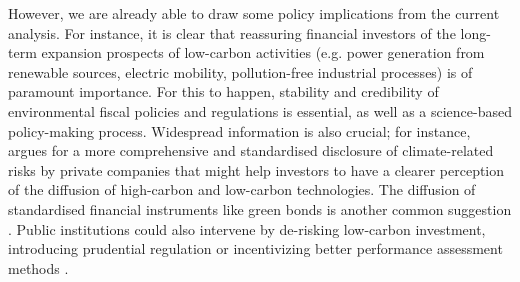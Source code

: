 \documentclass[authoryear]{article}
\begin{document}
However, we are already able to draw some policy implications from the current analysis. For instance, it is clear that reassuring financial investors of the long-term expansion prospects of low-carbon activities (e.g. power generation from renewable sources, electric mobility, pollution-free industrial processes) is of paramount importance. For this to happen, stability and credibility of environmental fiscal policies and regulations is essential, as well as a science-based policy-making process.  Widespread information is also crucial; for instance, \citet{TCFD2016} argues for a more comprehensive and standardised disclosure of climate-related risks by private companies that might help investors to have a clearer perception of the diffusion of high-carbon and low-carbon technologies. The diffusion of standardised financial instruments like green bonds is another common suggestion \citep{CBI2016}. Public institutions could also intervene by de-risking low-carbon investment, introducing prudential regulation or incentivizing better performance assessment methods \citep{UNEPInquiry2015}.


\newpage
\appendix






\end{document}
